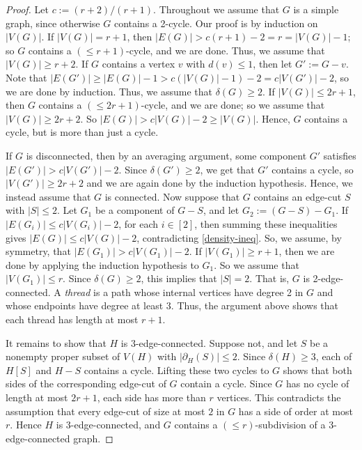 \documentclass[a4paper,12pt]{article}
\theoremstyle{plain}
\theoremstyle{definition}
\renewcommand\le\leqslant
\renewcommand\ge\geqslant
\begin{document}
\begin{proof}
    Let $c:=(r+2)/(r+1)$.
	Throughout we assume that $G$ is a simple graph, since otherwise $G$ contains a 2-cycle.
	Our proof is by induction on $|V(G)|$.  If $|V(G)|=r+1$, then $|E(G)| > c(r+1)-2 = r = |V(G)|-1$; 
	so $G$ contains a $(\le r+1)$-cycle, and we are done. Thus, we assume that $|V(G)|\ge r+2$.  If $G$ contains a vertex $v$ with $d(v)\le 1$,
	then let $G':=G-v$.  Note that $|E(G')| \ge |E(G)|-1 > c(|V(G)|-1)-2 = c|V(G')|-2$, so we are done by
	induction.  Thus, we assume that $\delta(G)\ge 2$.  If $|V(G)|\le 2r+1$, then $G$ contains a $(\le 2r+1)$-cycle,
	and we are done; so we assume that $|V(G)|\ge 2r+2$.  So $|E(G)|> c|V(G)| -2 \ge |V(G)|$.  
	Hence, $G$ contains a cycle, but is more than just a cycle.

	If $G$ is disconnected,
	then by an averaging argument, some component $G'$ satisfies $|E(G')| > c|V(G')|-2$.  Since $\delta(G')\ge 2$, we get that $G'$ contains a cycle, so $|V(G')|\ge 2r+2$ and we are again
	done by the induction hypothesis.  Hence, we instead assume that $G$ is connected.
	Now suppose that $G$ contains an edge-cut $S$ with $|S|\le 2$.  Let $G_1$ be a component of $G-S$,
	and let $G_2:=(G-S)-G_1$.  If $|E(G_i)| \le c|V(G_i)|-2$, for each $i\in [2]$, then summing these
	inequalities gives $|E(G)| \le c|V(G)|-2$,  contradicting \eqref{density-ineq}.  So, we assume, by symmetry, that
	$|E(G_1)| > c|V(G_1)|-2$.  If $|V(G_1)|\ge r+1$, then we are done by applying the induction hypothesis 
	to $G_1$.  So we assume that $|V(G_1)|\le r$.  Since $\delta(G)\ge 2$, this implies that $|S|=2$.
	That is, $G$ is 2-edge-connected.  
    A \emph{thread} is a path whose internal vertices have degree 2 in $G$ and whose endpoints have degree at least 3. 
    Thus, the argument above shows that each thread has length at most $r+1$.

    It remains to show that $H$ is $3$-edge-connected.  Suppose not, and let $S$ be a nonempty proper subset of $V(H)$ with $|\partial_H(S)|\le 2$.  Since $\delta(H)\ge 3$, each of $H[S]$ and $H-S$ contains a cycle.  Lifting these two cycles to $G$ shows that both sides of the corresponding edge-cut of $G$ contain a cycle.  Since $G$ has no cycle of length at most $2r+1$, each side has more than $r$ vertices.  This contradicts the assumption that every edge-cut of size at most $2$ in $G$ has a side of order at most $r$.  Hence $H$ is $3$-edge-connected, and $G$ contains a $(\le r)$-subdivision of a $3$-edge-connected graph.
\end{proof}
\end{document}
